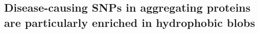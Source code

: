 \documentclass[10pt,letterpaper]{article}
\newcommand{\dSNPs}{dSNPs~}
\newcommand{\nSNPs}{nSNPs~}
\begin{document}







\subsection*{Disease-causing SNPs in aggregating proteins are particularly enriched in hydrophobic blobs}
\end{document}
